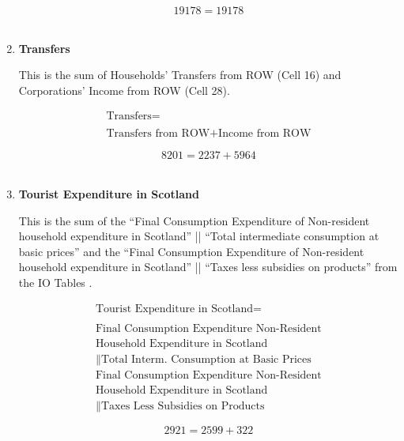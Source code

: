 \begin{enumerate}
\begin{equation} \nonumber
19178 = 19178
\end{equation}\\


\item \textbf {Transfers}

This is the sum of Households' Transfers from ROW (Cell 16) and Corporations' Income from ROW (Cell 28).

\begin{equation}
\begin{split}
\text{Transfers} =  \\ \\
\text{Transfers from ROW}+\text{Income from ROW}
\end{split} \label{eq:2.5.67}
\end{equation}

\begin{equation} \nonumber
8201 = 2237+5964
\end{equation}\\



\item \textbf {Tourist Expenditure in Scotland}

This is the sum of the ``Final Consumption Expenditure of Non-resident household expenditure in Scotland'' || ``Total intermediate consumption at basic prices'' and the ``Final Consumption Expenditure of Non-resident household expenditure in Scotland'' || ``Taxes less subsidies on products'' from the IO Tables \cite{ScotGov2013a}.

\begin{equation}
\begin{split}
\text{Tourist Expenditure in Scotland} =  \\ \\
\text{Final Consumption Expenditure Non-Resident}\\
\text{Household Expenditure in Scotland}\\
\|\text{Total Interm. Consumption at Basic Prices}\\
\text{Final Consumption Expenditure Non-Resident}\\
\text{Household Expenditure in Scotland}\\
\|\text{Taxes Less Subsidies on Products}
\end{split} \label{eq:2.5.68}
\end{equation}

\begin{equation} \nonumber
2921 = 2599+322
\end{equation}\\



\end{enumerate}
